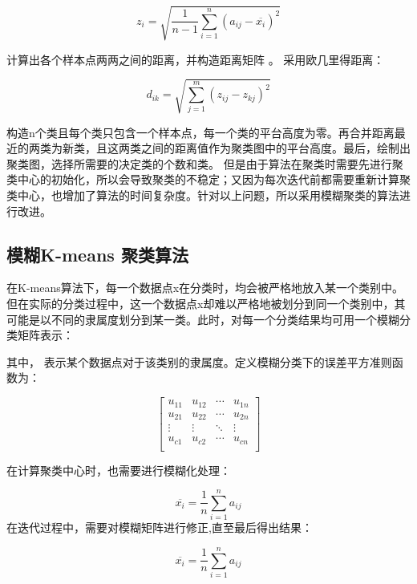 \begin{equation}
    z_i=\sqrt{\frac{1}{n-1}\sum_{i=1}^n(a_{ij}-\overline{x_i})^2}
\end{equation}
    
计算出各个样本点两两之间的距离，并构造距离矩阵 。
采用欧几里得距离：
 
\begin{equation}
    d_{ik} = \sqrt{\sum_{j=1}^m(z_{ij}-z_{kj})^2}
\end{equation}
    
构造n个类且每个类只包含一个样本点，每一个类的平台高度为零。再合并距离最近的两类为新类，且这两类之间的距离值作为聚类图中的平台高度。最后，绘制出聚类图，选择所需要的决定类的个数和类。
但是由于算法在聚类时需要先进行聚类中心的初始化，所以会导致聚类的不稳定；又因为每次迭代前都需要重新计算聚类中心，也增加了算法的时间复杂度。针对以上问题，所以采用模糊聚类的算法进行改进。

\subsection{模糊K-means 聚类算法}
在K-means算法下，每一个数据点x在分类时，均会被严格地放入某一个类别中。但在实际的分类过程中，这一个数据点x却难以严格地被划分到同一个类别中，其可能是以不同的隶属度划分到某一类。此时，对每一个分类结果均可用一个模糊分类矩阵表示：
 
其中， 表示某个数据点对于该类别的隶属度。定义模糊分类下的误差平方准则函数为：

\begin{equation}
\begin{bmatrix}
u_{11} & u_{12} & \cdots & u_{1n}\\
u_{21} & u_{22} & \cdots & u_{2n} \\
\vdots  & \vdots  & \ddots  &\vdots  \\
u_{c1} & u_{c2} & \cdots & u_{cn} \\
\end{bmatrix}
\end{equation}

在计算聚类中心时，也需要进行模糊化处理：
 
\begin{equation}
    \overline{x_i} = \frac{1}{n}\sum_{i=1}^na_{ij}
    \end{equation}
在迭代过程中，需要对模糊矩阵进行修正,直至最后得出结果：
 
\begin{equation}
    \overline{x_i} = \frac{1}{n}\sum_{i=1}^na_{ij}
    \end{equation}
